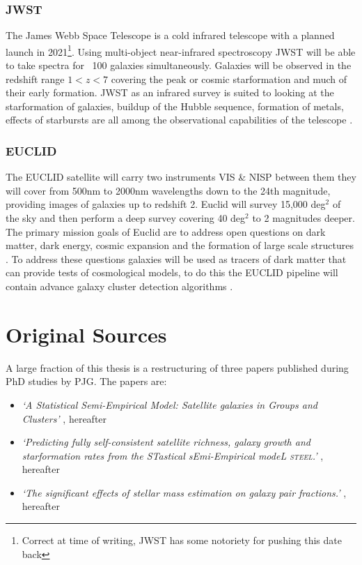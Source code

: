 \subsubsection{JWST \cite{JamesNASA}}

The James Webb Space Telescope is a cold infrared telescope with a planned launch in 2021\footnote{Correct at time of writing, JWST has some notoriety for pushing this date back}. Using multi-object near-infrared spectroscopy JWST will be able to take spectra for ~100 galaxies simultaneously. Galaxies will be observed in the redshift range $1 < z < 7$ covering the peak or cosmic starformation and much of their early formation. JWST as an infrared survey is suited to looking at the starformation of galaxies, buildup of the Hubble sequence, formation of metals, effects of starbursts are all among the observational capabilities of the telescope \cite{Windhorst2009JWST2009}.  


\subsubsection{EUCLID}

The EUCLID satellite will carry two instruments VIS \& NISP between them they will cover from 500nm to 2000nm wavelengths down to the 24th magnitude, providing images of galaxies up to redshift 2. Euclid will survey 15,000 deg$^2$ of the sky and then perform a deep survey covering 40 deg$^2$ to 2 magnitudes deeper. The primary mission goals of Euclid are to address open questions on dark matter, dark energy, cosmic expansion and the formation of large scale structures \cite{Amendola2018CosmologySatellite}. To address these questions galaxies will be used as tracers of dark matter that can provide tests of cosmological models, to do this the EUCLID pipeline will contain advance galaxy cluster detection algorithms \cite{EuclidCollaboration2019EuclidSelection}. 


\section{Original Sources}

A large fraction of this thesis is a restructuring of three papers published during PhD studies by PJG. The papers are:
\begin{itemize}
    \item \textit{`A Statistical Semi-Empirical Model: Satellite galaxies in Groups and Clusters'}  \citet{Grylls2019AClusters}, hereafter 
    \item \textit{`Predicting fully self-consistent satellite richness, galaxy growth and starformation rates from the STastical sEmi-Empirical modeL \textsc{steel}.'} \citet{Grylls2020PredictingSTEEL}, hereafter 
    \item \textit{`The significant effects of stellar mass estimation on galaxy pair fractions.'} \citet{Grylls2020TheFractions}, hereafter 
\end{itemize}

